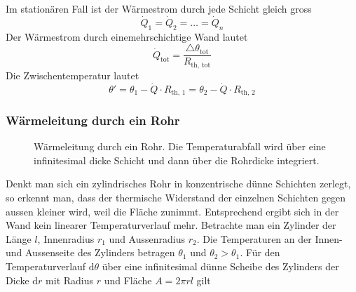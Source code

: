 Im stationären Fall ist der Wärmestrom durch jede Schicht gleich gross
\begin{equation}
\boxed{\dot{Q}_1=\dot{Q}_2=\dotso=\dot{Q}_n}
\end{equation}
Der Wärmestrom durch einemehrschichtige Wand lautet
\begin{equation}
\boxed{\dot{Q}_{\text{tot}}=\dfrac{\triangle \theta_{\text{tot}}}{R_{\text{th, tot}}}}
\end{equation}
Die Zwischentemperatur lautet
\begin{equation}
\boxed{\theta'=\theta_1-\dot{Q}\cdot R_{\text{th, 1}}=\theta_2-\dot{Q}\cdot R_{\text{th, 2}}}
\end{equation}
\subsubsection{Wärmeleitung durch ein Rohr}
\begin{figure}[H]
\centering
\caption{Wärmeleitung durch ein Rohr. Die Temperaturabfall wird über eine infinitesimal dicke Schicht und dann über die Rohrdicke integriert.}
\label{fig_Il}
\end{figure} 
Denkt man sich ein zylindrisches Rohr in konzentrische dünne Schichten zerlegt, so erkennt man, dass der thermische Widerstand der einzelnen Schichten gegen aussen kleiner wird, weil die Fläche zunimmt. Entsprechend ergibt sich in der Wand kein linearer Temperaturverlauf mehr. Betrachte man ein Zylinder der Länge $l$, Innenradius $r_1$ und Aussenradius $r_2$. Die Temperaturen an der Innen- und Aussenseite des Zylinders betragen $\theta_1$ und $\theta_2>\theta_1$. Für den Temperaturverlauf $\text{d}\theta$ über eine infinitesimal dünne Scheibe des Zylinders der Dicke $\text{d}r$ mit Radius $r$ und Fläche $A=2\pi r l$ gilt
